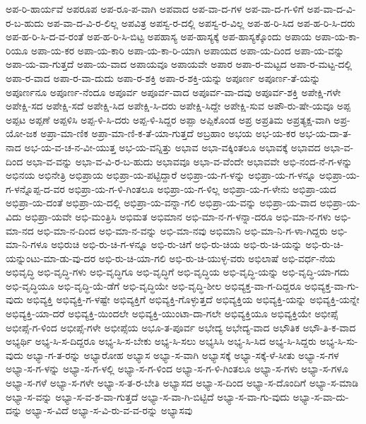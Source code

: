 {ಅಪ-ರಿ-ಹಾರ್ಯವೆ
ಅಪರೂಪ
ಅಪ-ರೂ-ಪ-ವಾಗಿ
ಅಪವಾದ
ಅಪ-ವಾ-ದ-ಗಳ
ಅಪ-ವಾ-ದ-ಗ-ಳಿಗೆ
ಅಪ-ವಾ-ದ-ವಿ-ರ-ಬ-ಹುದು
ಅಪ-ವಾ-ದ-ವಿ-ರ-ಲಿಲ್ಲ
ಅಪವಿತ್ರ
ಅಪಸ್ವ-ರ-ದಲ್ಲಿ
ಅಪಸ್ವ-ರ-ವಿಲ್ಲ
ಅಪ-ಹ-ರಿ-ಸಿದ
ಅಪ-ಹ-ರಿ-ಸಿ-ದರು
ಅಪ-ಹ-ರಿ-ಸಿ-ದ-ವ-ರಂತೆ
ಅಪ-ಹ-ರಿ-ಸಿ-ಬಿಟ್ಟ
ಅಪಹಾಸ್ಯ
ಅಪ-ಹಾಸ್ಯಕ್ಕೆ
ಅಪ-ಹಾಸ್ಯಕ್ಕೊಂದು
ಅಪಾಯ
ಅಪಾ-ಯ-ಕಾ-ರಿಯೂ
ಅಪಾ-ಯ-ಕರ
ಅಪಾ-ಯ-ಕಾರಿ
ಅಪಾ-ಯ-ಕಾ-ರಿ-ಯಾಗಿ
ಅಪಾಯದ
ಅಪಾ-ಯ-ದಿಂದ
ಅಪಾ-ಯ-ವನ್ನು
ಅಪಾ-ಯ-ವಾ-ಗುತ್ತದೆ
ಅಪಾ-ಯ-ವಾದ
ಅಪಾಯವೂ
ಅಪಾಯವೇ
ಅಪಾರ
ಅಪಾ-ರ-ಮಟ್ಟದ
ಅಪಾ-ರ-ಮಟ್ಟ-ದಲ್ಲಿ
ಅಪಾ-ರ-ವಾದ
ಅಪಾ-ರ-ವಾ-ದುದು
ಅಪಾ-ರ-ಶಕ್ತಿ
ಅಪಾ-ರ-ಶಕ್ತಿ-ಯನ್ನು
ಅಪೂರ್ಣ
ಅಪೂರ್ಣ-ತೆ-ಯನ್ನು
ಅಪೂರ್ಣನೂ
ಅಪೂರ್ಣ-ನೆಂದೂ
ಅಪೂರ್ವ
ಅಪೂರ್ವ-ವಾದ
ಅಪೂರ್ವ-ವಾ-ದವು
ಅಪೂರ್ವ-ಶಕ್ತಿ
ಅಪೇಕ್ಷಿ-ಗಳೇ
ಅಪೇಕ್ಷಿ-ಸದ
ಅಪೇಕ್ಷಿ-ಸದೆ
ಅಪೇಕ್ಷಿ-ಸಿದ
ಅಪೇಕ್ಷಿ-ಸಿ-ದರು
ಅಪೇಕ್ಷಿ-ಸಿದ್ದೇ
ಅಪೇಕ್ಷಿ-ಸುವ
ಅಪೌ-ರು-ಷೇ-ಯವೂ
ಅಪ್ಪ
ಅಪ್ಪಟ
ಅಪ್ಪಣೆ
ಅಪ್ಪಳಿಸಿ
ಅಪ್ಪ-ಳಿ-ಸಿ-ದರು
ಅಪ್ಪ-ಳಿ-ಸಿದ್ದರ
ಅಪ್ಪಾ
ಅಪ್ಪಿಕೊಂಡ
ಅಪ್ರ
ಅಪ್ರತಿಮ
ಅಪ್ರತ್ಯಕ್ಷ-ವಾಗಿ
ಅಪ್ರ-ಯೋ-ಜಕ
ಅಪ್ರಾ-ಮಾ-ಣಿಕ
ಅಪ್ರಾ-ಮಾ-ಣಿ-ಕ-ತೆ-ಯಾ-ಗುತ್ತದೆ
ಅಬ್ರಹಾಂ
ಅಭಯ
ಅಭ-ಯ-ಕರ
ಅಭ-ಯ-ದಾ-ತ-ನಾದ
ಅಭ-ಯ-ವ-ಚ-ನ-ವೀ-ಯುತ್ತ
ಅಭ-ಯ-ವನ್ನಿತ್ತು
ಅಭಾವ
ಅಭಾ-ವಕ್ಕಿಂತಲೂ
ಅಭಾವಕ್ಕೆ
ಅಭಾವದ
ಅಭಾ-ವ-ದಿಂದ
ಅಭಾ-ವ-ವನ್ನು
ಅಭಾ-ವ-ವಿ-ರ-ಬ-ಹುದು
ಅಭಾವವೂ
ಅಭಾ-ವ-ವೆಂದೇ
ಅಭಾವವೇ
ಅಭಿ-ನಂದ-ನೆ-ಗ-ಳನ್ನು
ಅಭಿನಯ
ಅಭಿನೇತ್ರಿ
ಅಭಿಪ್ರಾಯ
ಅಭಿಪ್ರಾ-ಯ-ಪಟ್ಟಿದ್ದಾರೆ
ಅಭಿಪ್ರಾ-ಯ-ಗ-ಳನ್ನು
ಅಭಿಪ್ರಾ-ಯ-ಗ-ಳನ್ನೂ
ಅಭಿಪ್ರಾ-ಯ-ಗ-ಳನ್ನೊಪ್ಪ-ದ-ವರ
ಅಭಿಪ್ರಾ-ಯ-ಗ-ಳಿ-ಗಿಂತಲೂ
ಅಭಿಪ್ರಾ-ಯ-ಗ-ಳಿಲ್ಲ
ಅಭಿಪ್ರಾ-ಯ-ಗ-ಳೇನು
ಅಭಿಪ್ರಾ-ಯದ
ಅಭಿಪ್ರಾ-ಯ-ದಂತೆ
ಅಭಿಪ್ರಾ-ಯ-ದಲ್ಲಿ
ಅಭಿಪ್ರಾ-ಯ-ವನ್ನಾ-ಗಲಿ
ಅಭಿಪ್ರಾ-ಯ-ವನ್ನು
ಅಭಿಪ್ರಾ-ಯ-ವಾದ
ಅಭಿಪ್ರಾ-ಯ-ವಿದು
ಅಭಿಪ್ರಾ-ಯವೇ
ಅಭಿ-ಮಂತ್ರಿಸಿ
ಅಭಿಮತ
ಅಭಿಮಾನ
ಅಭಿ-ಮಾ-ನ-ಗ-ಳನ್ನಾ-ದರೂ
ಅಭಿ-ಮಾ-ನ-ಗಳು
ಅಭಿ-ಮಾ-ನದ
ಅಭಿ-ಮಾ-ನ-ದಿಂದ
ಅಭಿ-ಮಾ-ನ-ವನ್ನು
ಅಭಿ-ಮಾ-ನವು
ಅಭಿಮಾನಿ
ಅಭಿ-ಮಾ-ನಿ-ಗ-ಳಾ-ಗಿದ್ದರು
ಅಭಿ-ಮಾ-ನಿ-ಗಳೂ
ಅಭಿರುಚಿ
ಅಭಿ-ರು-ಚಿ-ಗ-ಳನ್ನೂ
ಅಭಿ-ರು-ಚಿಗೆ
ಅಭಿ-ರು-ಚಿಯ
ಅಭಿ-ರು-ಚಿ-ಯನ್ನು
ಅಭಿ-ರು-ಚಿ-ಯನ್ನುಂಟು-ಮಾ-ಡು-ವು-ದರ
ಅಭಿ-ರು-ಚಿ-ಯಾ-ಗಲಿ
ಅಭಿ-ರು-ಚಿ-ಯುಳ್ಳ-ವರು
ಅಭಿಲಾಷೆ
ಅಭಿ-ವರ್ಧ-ನೆಯ
ಅಭಿವೃದ್ಧಿ
ಅಭಿ-ವೃದ್ಧಿ-ಗಳು
ಅಭಿ-ವೃದ್ಧಿಗೂ
ಅಭಿ-ವೃದ್ಧಿಗೆ
ಅಭಿ-ವೃದ್ಧಿಯ
ಅಭಿ-ವೃದ್ಧಿ-ಯನ್ನು
ಅಭಿ-ವೃದ್ಧಿ-ಯಾ-ಗದು
ಅಭಿ-ವೃದ್ಧಿಯೂ
ಅಭಿ-ವೃದ್ಧಿ-ಯೆ-ಡೆಗೆ
ಅಭಿ-ವೃದ್ಧಿಯೇ
ಅಭಿ-ವೃದ್ಧಿ-ಶೀಲ
ಅಭಿವ್ಯಕ್ತ-ವಾ-ಗ-ದಿದ್ದರೂ
ಅಭಿವ್ಯಕ್ತ-ವಾ-ಗು-ವುದು
ಅಭಿವ್ಯಕ್ತಿ
ಅಭಿವ್ಯಕ್ತಿ-ಗ-ಳಷ್ಟೇ
ಅಭಿವ್ಯಕ್ತಿಗೆ
ಅಭಿವ್ಯಕ್ತಿ-ಗೊಳ್ಳುತ್ತದೆ
ಅಭಿವ್ಯಕ್ತಿಯ
ಅಭಿವ್ಯಕ್ತಿ-ಯನ್ನು
ಅಭಿವ್ಯಕ್ತಿ-ಯನ್ನೇ
ಅಭಿವ್ಯಕ್ತಿ-ಯಾ-ದರೆ
ಅಭಿವ್ಯಕ್ತಿ-ಯಿಂದಲೇ
ಅಭಿವ್ಯಕ್ತಿ-ಯುಂಟಾ-ದಾ-ಗಲೇ
ಅಭಿವ್ಯಕ್ತಿಯೂ
ಅಭಿವ್ಯಕ್ತಿಯೇ
ಅಭೀಪ್ಸೆ
ಅಭೀಪ್ಸೆ-ಗ-ಳಿಂದ
ಅಭೀಪ್ಸೆ-ಗಳೇ
ಅಭೀಪ್ಸೆಯ
ಅಭೂ-ತ-ಪೂರ್ವ
ಅಭೇದ್ಯ
ಅಭೇದ್ಯ-ವಾದ
ಅಭೌತಿಕ
ಅಭೌ-ತಿ-ಕ-ವಾದ
ಅಭ್ಯರ್ಥಿ
ಅಭ್ಯ-ಸಿ-ಸ-ದಿದ್ದರೂ
ಅಭ್ಯ-ಸಿ-ಸ-ಬೇಕು
ಅಭ್ಯ-ಸಿ-ಸಲು
ಅಭ್ಯಸಿಸಿ
ಅಭ್ಯ-ಸಿ-ಸಿದ
ಅಭ್ಯ-ಸಿ-ಸಿದ್ದರು
ಅಭ್ಯ-ಸಿ-ಸು-ವುದು
ಅಭ್ಯಾ-ಗ-ತ-ರನ್ನು
ಅಭ್ಯಾರೋಹ
ಅಭ್ಯಾಸ
ಅಭ್ಯಾ-ಸ-ವಾಗಿ
ಅಭ್ಯಾಸಕ್ಕೆ
ಅಭ್ಯಾ-ಸಕ್ಕೆ-ಳೆ-ಸೀತು
ಅಭ್ಯಾ-ಸ-ಗಳ
ಅಭ್ಯಾ-ಸ-ಗ-ಳನ್ನು
ಅಭ್ಯಾ-ಸ-ಗ-ಳಲ್ಲಿ
ಅಭ್ಯಾ-ಸ-ಗ-ಳಿಂದ
ಅಭ್ಯಾ-ಸ-ಗ-ಳಿ-ಗಿಂತಲೂ
ಅಭ್ಯಾ-ಸ-ಗಳು
ಅಭ್ಯಾ-ಸ-ಗಳೂ
ಅಭ್ಯಾ-ಸ-ಗಳೆ
ಅಭ್ಯಾ-ಸ-ಗಳೇ
ಅಭ್ಯಾ-ಸ-ತ-ರ-ಬೇತಿ
ಅಭ್ಯಾಸದ
ಅಭ್ಯಾ-ಸ-ದಿಂದ
ಅಭ್ಯಾ-ಸ-ದೊಂದಿಗೆ
ಅಭ್ಯಾ-ಸ-ಮಾಡಿ
ಅಭ್ಯಾ-ಸ-ವನ್ನು
ಅಭ್ಯಾ-ಸ-ವ-ಶ-ವಾ-ಗುತ್ತದೆ
ಅಭ್ಯಾ-ಸ-ವಾ-ಗಿ-ಬಿಟ್ಟಿದೆ
ಅಭ್ಯಾ-ಸ-ವಾ-ಗು-ವುದು
ಅಭ್ಯಾ-ಸ-ವಾ-ದು-ದನ್ನು
ಅಭ್ಯಾ-ಸ-ವಿದೆ
ಅಭ್ಯಾ-ಸ-ವಿ-ರು-ವ-ವ-ರನ್ನು
ಅಭ್ಯಾಸವು
}
